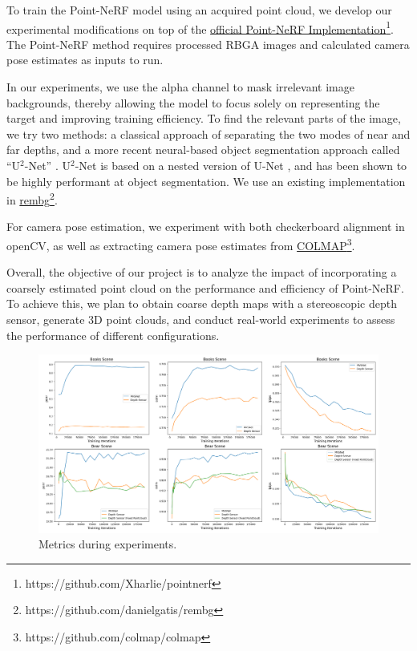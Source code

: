 \documentclass[10pt,twocolumn,letterpaper]{article}
\begin{document}
To train the Point-NeRF model using an acquired point cloud, we develop our experimental modifications on top of the \href{https://github.com/Xharlie/pointnerf}{official Point-NeRF Implementation}\footnote{https://github.com/Xharlie/pointnerf}. 
The Point-NeRF method requires processed RBGA images and calculated camera pose estimates as inputs to run. 

In our experiments, we use the alpha channel to mask irrelevant image backgrounds, thereby allowing the model to focus solely on representing the target and improving training efficiency. To find the relevant parts of the image, we try two methods: a classical approach of separating the two modes of near and far depths, and a more recent neural-based object segmentation approach called “U$^2$-Net” \cite{U2Net}. U$^2$-Net is based on a nested version of U-Net \cite{UNet}, and has been shown to be highly performant at object segmentation. We use an existing implementation in \href{https://github.com/danielgatis/rembg}{rembg}\footnote{https://github.com/danielgatis/rembg}.

For camera pose estimation, we experiment with both checkerboard alignment in openCV, as well as extracting camera pose estimates from \href{https://github.com/colmap/colmap}{COLMAP}\footnote{https://github.com/colmap/colmap}.
 
Overall, the objective of our project is to analyze the impact of incorporating a coarsely estimated point cloud on the performance and efficiency of Point-NeRF. To achieve this, we plan to obtain coarse depth maps with a stereoscopic depth sensor, generate 3D point clouds, and conduct real-world experiments to assess the performance of different configurations. 







\begin{figure}[h!]
  \centering
  \includegraphics[width=\linewidth]{images/loss.png}
  \caption{Metrics during experiments.}
  \label{fig:loss}
\end{figure}
\end{document}
